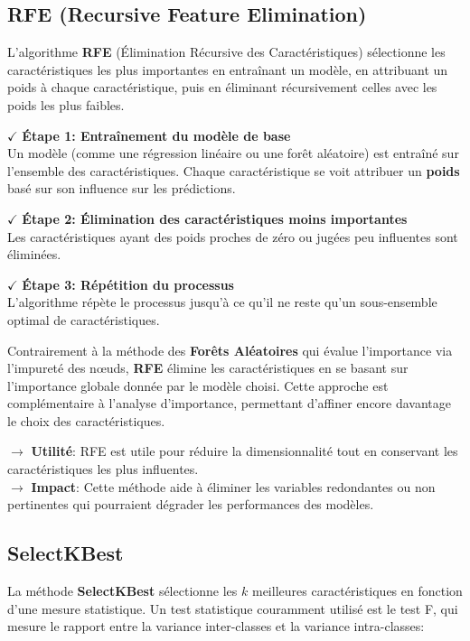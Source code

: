 \subsection{RFE (Recursive Feature Elimination)}

L'algorithme \textbf{RFE} (Élimination Récursive des Caractéristiques) sélectionne les caractéristiques les plus importantes en entraînant un modèle, en attribuant un poids à chaque caractéristique, puis en éliminant récursivement celles avec les poids les plus faibles.

\textbf{\(\checkmark\)} \textbf{Étape 1: Entraînement du modèle de base} \\ 
    Un modèle (comme une régression linéaire ou une forêt aléatoire) est entraîné sur l'ensemble des caractéristiques. Chaque caractéristique se voit attribuer un \textbf{poids} basé sur son influence sur les prédictions.

\textbf{\(\checkmark\)} \textbf{Étape 2: Élimination des caractéristiques moins importantes} \\ 
    Les caractéristiques ayant des poids proches de zéro ou jugées peu influentes sont éliminées.

\textbf{\(\checkmark\)} \textbf{Étape 3: Répétition du processus} \\ 
    L'algorithme répète le processus jusqu'à ce qu'il ne reste qu'un sous-ensemble optimal de caractéristiques.

Contrairement à la méthode des \textbf{Forêts Aléatoires} qui évalue l'importance via l'impureté des nœuds, \textbf{RFE} élimine les caractéristiques en se basant sur l'importance globale donnée par le modèle choisi. Cette approche est complémentaire à l'analyse d'importance, permettant d'affiner encore davantage le choix des caractéristiques.


\noindent \textbf{\(\rightarrow\)} \textbf{Utilité}: RFE est utile pour réduire la dimensionnalité tout en conservant les caractéristiques les plus influentes.\\
\textbf{\(\rightarrow\)} \textbf{Impact}: Cette méthode aide à éliminer les variables redondantes ou non pertinentes qui pourraient dégrader les performances des modèles.


\subsection{SelectKBest}

La méthode \textbf{SelectKBest} sélectionne les $k$ meilleures caractéristiques en fonction d'une mesure statistique. Un test statistique couramment utilisé est le test F, qui mesure le rapport entre la variance inter-classes et la variance intra-classes:

